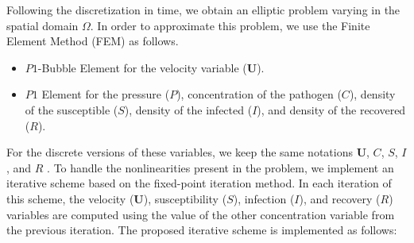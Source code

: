 \documentclass[10pt,number,preprint,times]{elsarticle}
\numberwithin{equation}{section} %
\begin{document}
	Following the discretization in time, we obtain an elliptic problem varying in the spatial domain $\Omega$. In order to approximate this problem, we use the Finite Element Method (FEM) as follows.
	
	\begin{itemize}
		\item[$\bullet$] 	$P1$-Bubble Element for the velocity variable ($\boldsymbol{U}$).
		\item[$\bullet$]  $P1$ Element for the pressure ($P$), concentration of the pathogen ($C$), density of the susceptible ($S$), density of the infected ($I$), and density of the recovered ($R$).
	\end{itemize}
	For the discrete versions of these variables, we keep the same notations $\boldsymbol{U}$, $C$, $S$, $I$, and $R$ . To handle the nonlinearities present in the problem, we implement an iterative scheme based on the fixed-point iteration method.
	In each iteration of this scheme, the velocity ($\boldsymbol{U}$), susceptibility ($S$), infection ($I$), and recovery ($R$) variables are computed using the value of the other concentration variable from the previous iteration. The proposed iterative scheme is implemented as follows:
\end{document}

